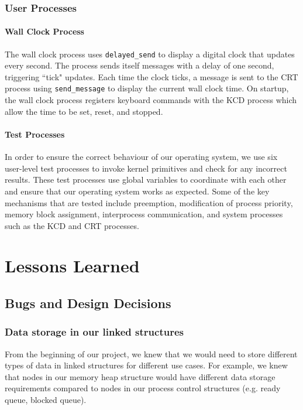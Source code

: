 \documentclass[12pt]{report}
\begin{document}
\section{User Processes}

\subsection{Wall Clock Process}

The wall clock process uses \texttt{delayed_send} to display a digital clock that updates every second. The process sends itself messages with a delay of one second,
triggering ``tick" updates. Each time the clock ticks, a message is sent to the CRT process using \texttt{send_message} to display the current wall clock time. On startup, the wall clock process registers keyboard commands with the KCD process which allow the time to be set, reset, and stopped.

\subsection{Test Processes}

In order to ensure the correct behaviour of our operating system, we use six user-­level test processes to invoke kernel primitives and check for any incorrect results. These test processes use global variables to coordinate with each other and ensure that  our operating system works as expected. Some of the key mechanisms that are tested include preemption, modification of process priority, memory block assignment, interprocess communication, and system processes such as the KCD and CRT processes.

\part{Lessons Learned}

\chapter{Bugs and Design Decisions}

\section{Data storage in our linked structures}

From the beginning of our project, we knew that we would need to store different types of data in linked structures for different use cases. For example, we knew that nodes in our memory heap structure would have different data storage requirements compared to nodes in our process control structures (e.g. ready queue, blocked queue).\\
\end{document}
